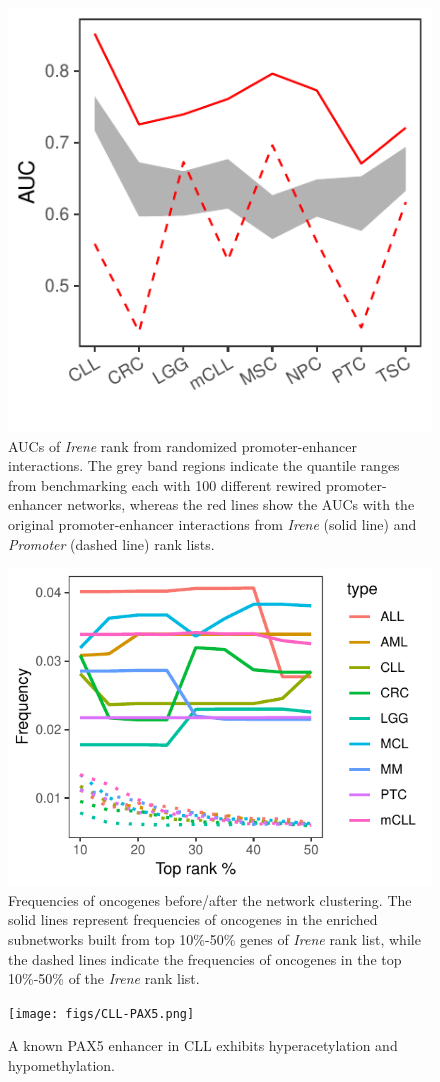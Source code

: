 \documentclass[a4paper,12pt]{article}
\begin{document}
\begin{figure}[!htb]
\centering
\includegraphics{figs/rnd.pdf}
\caption{AUCs of {\em Irene} rank from randomized promoter-enhancer interactions. The grey band regions indicate the quantile ranges from benchmarking each with 100 different rewired promoter-enhancer networks, whereas the red lines show the AUCs with the original promoter-enhancer interactions from {\em Irene} (solid line) and {\em Promoter} (dashed line) rank lists. }
\label{fig:rnd}
\end{figure}

\begin{figure}[!htb]
\centering
\includegraphics{figs/netRank.pdf}
\caption{Frequencies of oncogenes before/after the network clustering. The solid lines represent frequencies of oncogenes in the enriched subnetworks built from top 10\%-50\% genes of {\em Irene} rank list, while the dashed lines indicate the frequencies of oncogenes in the top 10\%-50\% of the {\em Irene} rank list. }
\label{fig:netrank}
\end{figure}


\begin{figure}[!htb]
\texttt{[image: figs/CLL-PAX5.png]}
\caption{A known PAX5 enhancer in CLL exhibits hyperacetylation and hypomethylation. }
\label{fig:enhpax5}
\end{figure}
\end{document}
